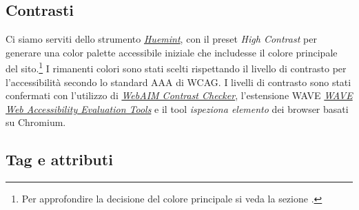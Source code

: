 \subsection{Contrasti}
Ci siamo serviti dello strumento \href{https://huemint.com/brand-intersection/}{\textit{Huemint}}, con il preset \textit{High Contrast} per generare una color palette accessibile iniziale che includesse il colore principale del sito.\footnote{Per approfondire la decisione del colore principale si veda la sezione \textit{}.}
I rimanenti colori sono stati scelti rispettando il livello di contrasto per l’accessibilità secondo lo standard AAA di WCAG. I livelli di contrasto sono stati confermati con l’utilizzo di \href{https://webaim.org/resources/contrastchecker/}{\textit{WebAIM Contrast Checker}}, l’estensione WAVE \href{https://wave.webaim.org/extension/}{\textit{WAVE Web Accessibility Evaluation Tools}} e il tool \textit{ispeziona elemento} dei browser basati su Chromium.

\subsection{Tag e attributi}

